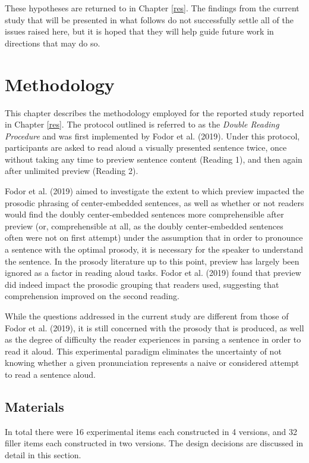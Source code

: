 \documentclass[11pt,oneside]{book}
\begin{document}
These hypotheses are returned to in Chapter \ref{res}. The findings from the current study that will be presented in what follows do not successfully settle all of the issues raised here, but it is hoped that they will help guide future work in directions that may do so.

\hypertarget{method}{%
\chapter{Methodology}\label{method}}

This chapter describes the methodology employed for the reported study reported in Chapter \ref{res}. The protocol outlined is referred to as the \emph{Double Reading Procedure} and was first implemented by Fodor et al. (2019). Under this protocol, participants are asked to read aloud a visually presented sentence twice, once without taking any time to preview sentence content (Reading 1), and then again after unlimited preview (Reading 2).

Fodor et al. (2019) aimed to investigate the extent to which preview impacted the prosodic phrasing of center-embedded sentences, as well as whether or not readers would find the doubly center-embedded sentences more comprehensible after preview (or, comprehensible at all, as the doubly center-embedded sentences often were not on first attempt) under the assumption that in order to pronounce a sentence with the optimal prosody, it is necessary for the speaker to understand the sentence. In the prosody literature up to this point, preview has largely been ignored as a factor in reading aloud tasks. Fodor et al. (2019) found that preview did indeed impact the prosodic grouping that readers used, suggesting that comprehension improved on the second reading.

While the questions addressed in the current study are different from those of Fodor et al. (2019), it is still concerned with the prosody that is produced, as well as the degree of difficulty the reader experiences in parsing a sentence in order to read it aloud. This experimental paradigm eliminates the uncertainty of not knowing whether a given pronunciation represents a naive or considered attempt to read a sentence aloud.

\hypertarget{mat}{%
\section{Materials}\label{mat}}

In total there were 16 experimental items each constructed in 4 versions, and 32 filler items each constructed in two versions. The design decisions are discussed in detail in this section.
\end{document}
